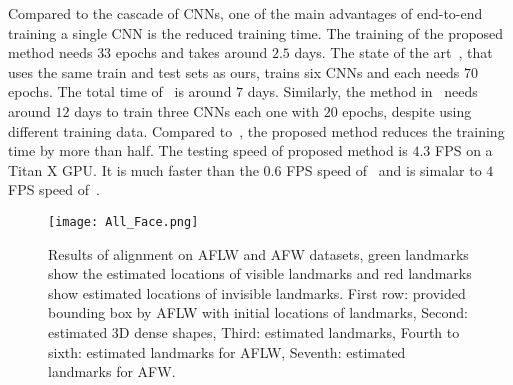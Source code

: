 \vspace{-2mm}
\vspace{-2mm}
Compared to the cascade of CNNs, one of the main advantages of end-to-end training a single CNN is the reduced training time. 
The training of the proposed method needs $33$ epochs and takes around $2.5$ days. 
The state of the art~\cite{jourabloo2016large}, that uses the same train and test sets as ours, trains six CNNs and each needs $70$ epochs. 
The total time of~\cite{jourabloo2016large} is around $7$ days. 
Similarly, the method in~\cite{zhu2015face} needs around $12$ days to train three CNNs each one with $20$ epochs, despite using different training data. 
Compared to~\cite{jourabloo2016large}, the proposed method reduces the training time by more than half.
The testing speed of proposed method is $4.3$ FPS on a Titan X GPU. It is much faster than the $0.6$ FPS speed of~\cite{jourabloo2016large} and is simalar to $4$ FPS speed of~\cite{xiao2016robust}. 







































































\begin{figure*}[h!]\small
\begin{center}
\texttt{[image: All\_Face.png]} 
\end{center}

   \caption{Results of alignment on AFLW and AFW datasets, green landmarks show the estimated locations of visible landmarks and red landmarks show estimated locations of invisible landmarks. First row: provided bounding box by AFLW with initial locations of landmarks, Second: estimated $3$D dense shapes, Third: estimated landmarks, Fourth to sixth: estimated landmarks for AFLW, Seventh: estimated landmarks for AFW.}
   \label{figure:ResAFLWAFW1}
\end{figure*}



